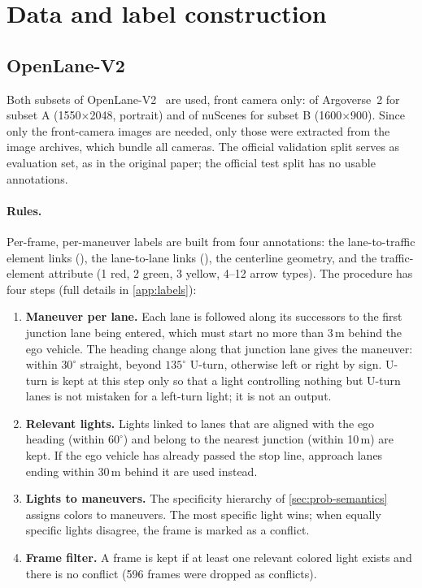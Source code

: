\section{Data and label construction}
\label{sec:method-labels}

\subsection{OpenLane-V2}

Both subsets of OpenLane-V2~ are used, front camera only:  of Argoverse~2 for
subset A (1550$\times$2048, portrait) and  of nuScenes for subset B
(1600$\times$900). Since only the front-camera images are needed, only those were extracted from the
image archives, which bundle all cameras. The official validation split serves as evaluation set, as in
the original paper; the official test split has no usable annotations.

\paragraph{Rules.} Per-frame, per-maneuver labels are built from four annotations: the lane-to-traffic
element links (), the lane-to-lane links (), the centerline
geometry, and the traffic-element attribute (1 red, 2 green, 3 yellow, 4--12 arrow types). The procedure
has four steps (full details in \cref{app:labels}):
\begin{enumerate}
  \item \textbf{Maneuver per lane.} Each lane is followed along its successors to the first junction
        lane being entered, which must start no more than 3\,m behind the ego vehicle. The heading change
        along that junction lane gives the maneuver: within $30^\circ$ straight, beyond $135^\circ$
        U-turn, otherwise left or right by sign. U-turn is kept at this step only so that a light
        controlling nothing but U-turn lanes is not mistaken for a left-turn light; it is not an output.
  \item \textbf{Relevant lights.} Lights linked to lanes that are aligned with the ego heading (within
        $60^\circ$) and belong to the nearest junction (within 10\,m) are kept. If the ego vehicle has
        already passed the stop line, approach lanes ending within 30\,m behind it are used instead.
  \item \textbf{Lights to maneuvers.} The specificity hierarchy of \cref{sec:prob-semantics} assigns
        colors to maneuvers. The most specific light wins; when equally specific lights disagree, the
        frame is marked as a conflict.
  \item \textbf{Frame filter.} A frame is kept if at least one relevant colored light exists and there
        is no conflict (596 frames were dropped as conflicts).
\end{enumerate}

